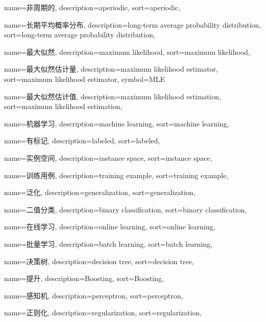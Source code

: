 {
	name=非周期的,
	description={aperiodic},
	sort={aperiodic},
}

{
	name=长期平均概率分布,
	description={long-term average probability distribution},
	sort={long-term average probability distribution},
}

{
	name=最大似然,
	description={maximum likelihood},
	sort={maximum likelihood},
}

{
	name=最大似然估计量,
	description={maximum likelihood estimator},
	sort={maximum likelihood estimator},
	symbol={MLE}
}

{
	name=最大似然估计值,
	description={maximum likelihood estimation},
	sort={maximum likelihood estimation},
}

{
	name=机器学习,
	description={machine learning},
	sort={machine learning},
}

{
	name=有标记,
	description={labeled},
	sort={labeled},
}

{
	name=实例空间,
	description={instance space},
	sort={instance space},
}

{
	name=训练用例,
	description={training example},
	sort={training example},
}

{
	name=泛化,
	description={generalization},
	sort={generalization},
}

{
	name=二值分类,
	description={binary classification},
	sort={binary classification},
}

{
	name=在线学习,
	description={online learning},
	sort={online learning},
}

{
	name=批量学习,
	description={batch learning},
	sort={batch learning},
}

{
	name=决策树,
	description={decision tree},
	sort={decision tree},
}

{
	name=提升,
	description={Boosting},
	sort={Boosting},
}

{
	name=感知机,
	description={perceptron},
	sort={perceptron},
}

{
	name=正则化,
	description={regularization},
	sort={regularization},
}

